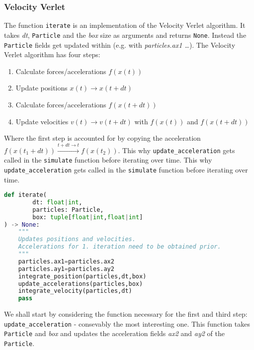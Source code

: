 \documentclass{article}
\begin{document}
\subsubsection{Velocity Verlet}
The function \texttt{iterate} is an implementation of the Velocity Verlet algorithm. It takes \textit{dt}, \texttt{Particle} and the \textit{box} size as arguments and returns \texttt{None}. Instead the \texttt{Particle} fields get updated within (e.g. with \textit{particles.ax1 \dots}). The Velocity Verlet algorithm has four steps:
\begin{enumerate}
    \item Calculate forces/accelerations $f(x(t))$ 
    \item Update positions $x(t) \rightarrow x(t+dt)$ 
    \item Calculate forces/accelerations $f(x(t+dt))$ 
    \item Update velocities $v(t) \rightarrow v(t+dt)$ with $f(x(t))$ and $f(x(t+dt))$
\end{enumerate} 
Where the first step is accounted for by copying the acceleration $f(x(t_1+dt)) \overset{t+dt \longrightarrow t}{\rightarrow}f(x(t_2))$. This why \texttt{update_acceleration} gets called in the \texttt{simulate} function before iterating over time. This why \texttt{update_acceleration} gets called in the \texttt{simulate} function before iterating over time.
\pagebreak
\begin{lstlisting}[language=Python, caption=Iterates the positions by Velocity Verlet]
def iterate(
        dt: float|int,
        particles: Particle,
        box: tuple[float|int,float|int]
) -> None:
    """
    Updates positions and velocities. 
    Accelerations for 1. iteration need to be obtained prior. 
    """
    particles.ax1=particles.ax2
    particles.ay1=particles.ay2
    integrate_position(particles,dt,box)
    update_accelerations(particles,box)
    integrate_velocity(particles,dt)
    pass
\end{lstlisting}
\pagebreak
We shall start by considering the function necessary for the first and third step: \texttt{update_acceleration} - consevably the most interesting one. This function takes \texttt{Particle} and \textit{box} and updates the acceleration fields \textit{ax2} and \textit{ay2} of the \texttt{Particle}. 
\end{document}
